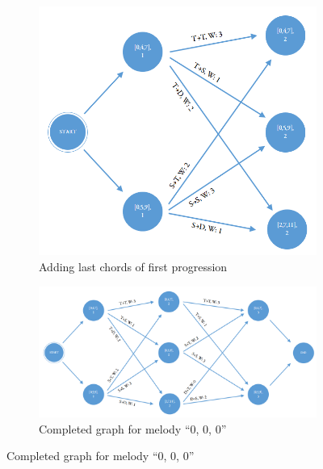 \begin{figure}[!tbp]
\begin{subfigure}[b]{0.49\linewidth}
   \includegraphics[width=\linewidth]{Chapters/pic/42}
   \caption{Adding last chords of first progression}
   \label{fig:42}
\end{subfigure}

\begin{subfigure}[b]{1.2\linewidth}
   \hspace{-1.1cm}\includegraphics[width=\linewidth]{Chapters/pic/43}
   \hspace{-1.1cm}\caption{Completed graph for melody ``0, 0, 0''}
   \label{fig:43}
\end{subfigure}


\end{figure}
